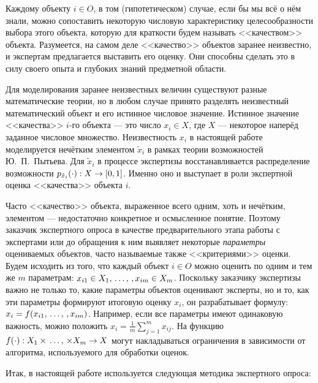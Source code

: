 Каждому объекту $i \in O$, в том (гипотетическом) случае, если бы мы всё о нём знали, можно сопоставить некоторую числовую характеристику целесообразности выбора этого объекта, которую для краткости будем называть <<качеством>> объекта. Разумеется, на самом деле <<качество>> объектов заранее неизвестно, и экспертам предлагается выставить его оценку. Они способны сделать это в силу своего опыта и глубоких знаний предметной области.

Для моделирования заранее неизвестных величин существуют разные математические теории, но в любом случае принято разделять неизвестный математический объект и его истинное числовое значение. Истинное значение <<качества>> $i$-го объекта --- это число $x_i \in X$, где $X$ --- некоторое наперёд заданное числовое множество. Неизвестность $x_i$ в настоящей работе моделируется нечётким элементом $\tilde x_i$ в рамках теории возможностей Ю.~П.~Пытьева. Для $\tilde x_i$ в процессе экспертизы восстанавливается распределение возможности $p_{\tilde x_i}(\cdot): X \rightarrow [0,1]$. Именно оно и выступает в роли экспертной оценка <<качества>> объекта $i$.  

Часто <<качество>> объекта, выраженное всего одним, хоть и нечётким, элементом --- недостаточно конкретное и осмысленное понятие. Поэтому заказчик экспертного опроса в качестве предварительного этапа работы с экспертами или до обращения к ним выявляет некоторые {\sl параметры} оцениваемых объектов, часто называемые также <<критериями>> оценки. Будем исходить из того, что каждый объект $i \in O$ можно оценить по одним и тем же $m$ параметрам: $x_{i1} \in X_1, \, \ldots,\,, x_{im} \in X_m$.  Поскольку заказчику экспертизы важно не только то, какие параметры объектов оценивают эксперты, но и то, как эти параметры формируют итоговую оценку $x_i$, он разрабатывает формулу: $x_i = f(x_{i1}, \, \ldots,\,, x_{im})$. Например, если все параметры имеют одинаковую важность, можно положить $x_i = \frac{1}{m}\sum_{j=1}^m{x_{ij}}$. На функцию $f(\cdot): X_1 \times \, \ldots,\, \times X_m \rightarrow X$ могут накладываться ограничения в зависимости от алгоритма, используемого для обработки оценок. 


Итак, в настоящей работе используется следующая методика экспертного опроса:
\begin{center}  \end{center}

